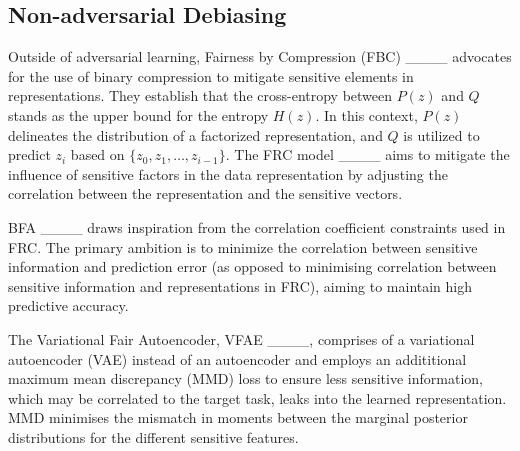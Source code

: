 \subsection{Non-adversarial Debiasing}
Outside of adversarial learning, Fairness by Compression (FBC) ____ advocates for the use of binary compression to mitigate sensitive elements in representations. They establish that the cross-entropy between \( P(z) \) and \( Q \) stands as the upper bound for the entropy \( H(z) \). In this context, \( P(z) \) delineates the distribution of a factorized representation, and \( Q \) is utilized to predict \( z_i \) based on \( \{ z_0, z_1, \dots , z_{i-1} \} \). The FRC model ____ aims to mitigate the influence of sensitive factors in the data representation by adjusting the correlation between the representation and the sensitive vectors.



BFA ____ draws inspiration from the correlation coefficient constraints used in FRC. The primary ambition is to minimize the correlation between sensitive information and prediction error (as opposed to minimising correlation between sensitive information and representations in FRC), aiming to maintain high predictive accuracy.

The Variational Fair Autoencoder, VFAE ____, comprises of a variational autoencoder (VAE) instead of an autoencoder and employs an addititional maximum mean discrepancy (MMD) loss to ensure less sensitive information, which may be correlated to the target task, leaks into the learned representation. MMD minimises the mismatch in moments between the marginal posterior distributions for the different sensitive features.

